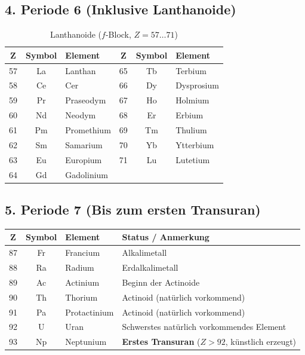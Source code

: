 \documentclass{article}
\begin{document}
	\subsection*{4. Periode 6 (Inklusive Lanthanoide)}
	\begin{table}[htbp]
		\centering
		\small
		\caption{Lanthanoide ($f$-Block, $Z = 57 \dots 71$)}
		\begin{tabular}{cclccl}
			\toprule
			$\mathbf{Z}$ & \textbf{Symbol} & \textbf{Element} & $\mathbf{Z}$ & \textbf{Symbol} & \textbf{Element} \\
			\midrule
			57 & La & Lanthan     & 65 & Tb & Terbium \\
			58 & Ce & Cer         & 66 & Dy & Dysprosium \\
			59 & Pr & Praseodym   & 67 & Ho & Holmium \\
			60 & Nd & Neodym      & 68 & Er & Erbium \\
			61 & Pm & Promethium  & 69 & Tm & Thulium \\
			62 & Sm & Samarium    & 70 & Yb & Ytterbium \\
			63 & Eu & Europium    & 71 & Lu & Lutetium \\
			64 & Gd & Gadolinium  &    &    & \\
			\bottomrule
		\end{tabular}
	\end{table}
	
	\subsection*{5. Periode 7 (Bis zum ersten Transuran)}
	\begin{table}[htbp]
		\centering
		\small
		\begin{tabular}{ccll}
			\toprule
			$\mathbf{Z}$ & \textbf{Symbol} & \textbf{Element} & \textbf{Status / Anmerkung} \\
			\midrule
			87 & Fr & Francium    & Alkalimetall \\
			88 & Ra & Radium      & Erdalkalimetall \\
			89 & Ac & Actinium    & Beginn der Actinoide \\
			90 & Th & Thorium     & Actinoid (natürlich vorkommend) \\
			91 & Pa & Protactinium & Actinoid (natürlich vorkommend) \\
			92 & U  & Uran        & Schwerstes natürlich vorkommendes Element \\
			\midrule
			93 & Np & Neptunium   & \textbf{Erstes Transuran} ($Z > 92$, künstlich erzeugt) \\
			\bottomrule
		\end{tabular}
	\end{table}
	
\end{document}
